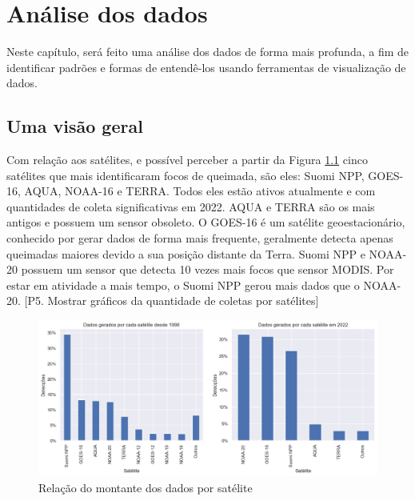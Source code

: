 \documentclass[cic,tc]{iiufrgs}
\begin{document}

\chapter{Análise dos dados}

Neste capítulo, será feito uma análise dos dados de forma mais profunda, a 
fim de identificar padrões e formas de entendê-los usando ferramentas de 
visualização de dados.

\section{Uma visão geral}



Com relação aos satélites, e possível perceber a partir da Figura
\ref{fig:porcentagem_satelites} cinco satélites que mais identificaram  
focos de queimada, são eles: Suomi NPP, GOES-16, AQUA, NOAA-16 e TERRA. 
Todos eles estão 
ativos atualmente e com quantidades de coleta significativas em 2022. AQUA e TERRA 
são os mais antigos e possuem um sensor obsoleto. O GOES-16 é um satélite
geoestacionário, conhecido por gerar dados de forma mais frequente, geralmente 
detecta apenas queimadas maiores devido a sua posição distante da Terra. Suomi NPP e
NOAA-20 possuem um sensor que detecta 10 vezes mais focos que sensor MODIS. Por 
estar em atividade a mais tempo, o Suomi NPP gerou mais dados que o NOAA-20.
[P5. Mostrar gráficos da quantidade de coletas por satélites] \par

\begin{figure}
    \caption{Relação do montante dos dados por satélite}
    \begin{center}
        \includegraphics[width=35em]{porcentagem_satelites}
    \end{center}
    \label{fig:porcentagem_satelites}
\end{figure}
\end{document}
